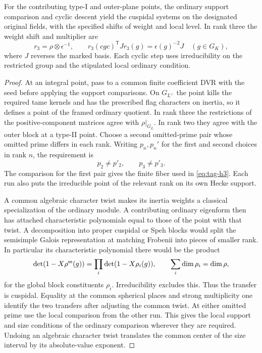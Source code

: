 \begin{proposition}
\label{prop:ordinary-host-attachment}
For the contributing type-I and outer-plane points, the
ordinary support comparison and cyclic descent yield the
cuspidal systems on the designated original fields, with the
specified shifts of weight and local level. In rank three the weight shift and multiplier are
\[
 r_3=\rho\otimes\epsilon^{-1},\qquad
 r_3(cgc)^{\mathsf T}Jr_3(g)=\epsilon(g)^{-2}J\quad(g\in G_K),
\]
where \(J\) reverses the marked basis. Each cyclic step uses irreducibility on the restricted group and the stipulated
local ordinary condition.
\end{proposition}

\begin{proof}
At an integral point, pass to a common finite coefficient
DVR with the seed before applying the support comparisons.
On \(G_{L^+}\) the point kills the required tame kernels
and has the prescribed flag characters on inertia, so it
defines a point of the framed ordinary quotient. In rank
three the restrictions of the positive-component matrices
agree with \(\rho|_{G_L}\). In rank two they agree with the
outer block at a type-II point. Choose a second omitted-prime pair whose omitted prime differs in each rank. Writing \(p_n,p_n'\) for the first and second choices in rank \(n\), the requirement is
\[
 p_2\ne p'_2,\qquad p_3\ne p'_3 .
\]
The comparison for the first pair gives the finite fiber
used in \eqref{eq:tag-h3}. Each run also puts the irreducible point of
the relevant rank on its own Hecke support.

A common
algebraic character twist makes its inertia weights a
classical specialization of the ordinary module. A
contributing ordinary eigenform then has attached
characteristic polynomials equal to those of the point
with that twist. A decomposition into proper cuspidal or Speh blocks would split the semisimple Galois representation at matching Frobenii into pieces of smaller rank. In particular its characteristic polynomial there would be the product
\[
 \det(1-X\rho^{\rm ss}(g))=\prod_i\det(1-X\rho_i(g)),\qquad \sum_i\dim\rho_i=\dim\rho,
\]
for the global block constituents \(\rho_i\). Irreducibility excludes this. Thus the
transfer is cuspidal. Equality at the common spherical
places and strong multiplicity one identify the two
transfers after adjusting the common twist. At either
omitted prime use the local comparison from the other
run. This gives the local support and size conditions of
the ordinary comparison wherever they are required.
Undoing an algebraic character twist translates the common
center of the size interval by its absolute-value exponent.


\end{proof}

